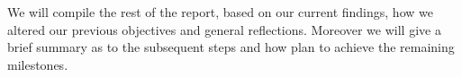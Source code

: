 We will compile the rest of the report, based on our current findings, how we altered our previous objectives 
and general reflections. Moreover we will give a brief summary as to the subsequent steps
and how plan to achieve the remaining milestones.


%
%
%
%
%
%
%
%
%
%
%
%
%
%
%

